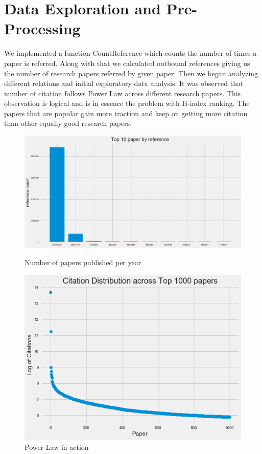 \documentclass[a4paper, 11pt]{article}
\begin{document}
\section*{Data Exploration and Pre-Processing}
We implemented a function CountReference which counts the number of times a paper is referred. Along with that we calculated outbound references giving us the number of research papers referred by given paper. Then we began analyzing different relations and initial exploratory data analysis. It was observed that number of citation follows Power Law across different research papers. This observation is logical and is in essence the problem with H-index ranking. The papers that are popular gain more traction and keep on getting more citation than other equally good research papers.
\begin{figure}
    \centering
    \begin{minipage}{0.45\textwidth}
        \centering
        \includegraphics[width=1.1\textwidth]{top_10_papers.png}
        \caption{Number of papers published per year}
    \end{minipage}\hfill
    \begin{minipage}{0.45\textwidth}
        \centering
        \includegraphics[width=.9\textwidth]{power_law.png}
        \caption{Power Law in action}
    \end{minipage}
\end{figure}
\FloatBarrier
\\
\end{document}
